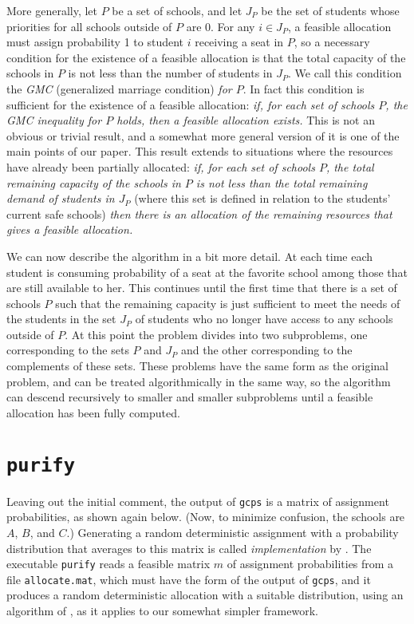\documentclass[12pt]{article}
\theoremstyle{definition}
\begin{document}
More generally, let $P$ be a set of schools, and let $J_P$ be the set
of students whose priorities for all schools outside of $P$ are 0.
For any $i \in J_P$, a feasible allocation must assign probability 1
to student $i$ receiving a seat in $P$, so a necessary condition for
the existence of a feasible allocation is that the total capacity of
the schools in $P$ is not less than the number of students in $J_P$.
We call this condition the \emph{GMC} (generalized marriage condition)
\emph{for $P$}.  In fact this condition is sufficient for the
existence of a feasible allocation: \emph{if, for each set of schools
$P$, the GMC inequality for $P$ holds, then a feasible allocation
exists.}  This is not an obvious or trivial result, and a somewhat
more general version of it is one of the main points of our paper.
This result extends to situations where the resources have already
been partially allocated: \emph{if, for each set of schools $P$, the
total remaining capacity of the schools in $P$ is not less than the
total remaining demand of students in $J_P$} (where this set is
defined in relation to the students' current safe schools) \emph{then
there is an allocation of the remaining resources that gives a
feasible allocation.}

We can now describe the algorithm in a bit more detail.  At each time
each student is consuming probability of a seat at the favorite school
among those that are still available to her.  This continues until the
first time that there is a set of schools $P$ such that the remaining
capacity is just sufficient to meet the needs of the students in the
set $J_P$ of students who no longer have access to any schools outside
of $P$.  At this point the problem divides into two subproblems, one
corresponding to the sets $P$ and $J_P$ and the other corresponding to
the complements of these sets.  These problems have the same form as
the original problem, and can be treated algorithmically in the same
way, so the algorithm can descend recursively to smaller and smaller
subproblems until a feasible allocation has been fully computed.


\section{\texttt{purify}} \label{sec:Implementation}

Leaving out the initial comment, the output of \texttt{gcps} is a
matrix of assignment probabilities, as shown again below.
(Now, to minimize confusion, the schools are $A$, $B$, and $C$.)  
Generating a random deterministic assignment with a probability
distribution that averages to this matrix is called
\emph{implementation} by \cite{bckm13aer}.  The executable
\texttt{purify} reads a feasible matrix $m$ of assignment
probabilities from a file \texttt{allocate.mat}, which must have the
form of the output of \texttt{gcps}, and it produces a random
deterministic allocation with a suitable distribution, using an
algorithm of \cite{bckm13aer}, as it applies to our somewhat simpler
framework.
\end{document}
